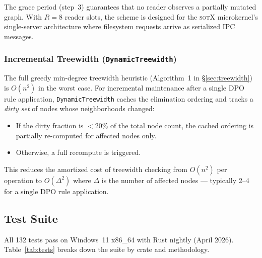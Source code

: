 \documentclass[11pt,a4paper]{article}
\theoremstyle{definition}
\newcommand{\sotos}{\textsc{sotX}}
\begin{document}
The grace period (step~3) guarantees that no reader observes a partially
mutated graph.  With $R = 8$ reader slots, the scheme is designed for the
\sotos{} microkernel's single-server architecture where filesystem requests
arrive as serialized IPC messages.

\subsubsection{Incremental Treewidth (\texttt{DynamicTreewidth})}

The full greedy min-degree treewidth heuristic (Algorithm~1 in
\S\ref{sec:treewidth}) is $O(n^2)$ in the worst case.  For incremental
maintenance after a single DPO rule application, \texttt{DynamicTreewidth}
caches the elimination ordering and tracks a \emph{dirty set} of nodes
whose neighborhoods changed:

\begin{itemize}[nosep]
  \item If the dirty fraction is $< 20\%$ of the total node count, the
        cached ordering is partially re-computed for affected nodes only.
  \item Otherwise, a full recompute is triggered.
\end{itemize}

This reduces the amortized cost of treewidth checking from $O(n^2)$ per
operation to $O(\Delta^2)$ where $\Delta$ is the number of affected nodes
--- typically 2--4 for a single DPO rule application.

\subsection{Test Suite}\label{sec:tests}

All 132 tests pass on Windows~11 x86\_64 with Rust nightly (April 2026).
Table~\ref{tab:tests} breaks down the suite by crate and methodology.
\end{document}

